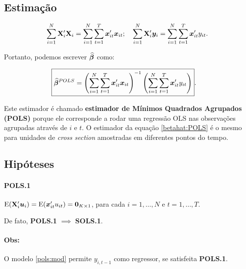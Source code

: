 \documentclass[11pt, oneside, a4paper, article]{article}
\numberwithin{equation}{section}
\begin{document}
\subsection{Estimação}

\begin{align*}
\sum_{i=1}^{N} \mathbf{X}_{i}' \mathbf{X}_{i}
=
\sum_{i=1}^{N} \sum_{t=1}^{T} \boldsymbol{x}_{it}' \boldsymbol{x}_{it};
\quad
\sum_{i=1}^{N} \mathbf{X}_{i}' \boldsymbol{y}_{i}
=
\sum_{i=1}^{N} \sum_{t=1}^{T} \boldsymbol{x}_{it}' y_{it}.
\end{align*}

Portanto, podemos escrever $\widehat{\boldsymbol{\beta}}$ como:

\vspace{-1 em}
\begin{align} \label{betahat:POLS}
\Aboxed{
\betahatbold^{POLS} =
\left( \sum_{i=1}^{N} \sum_{t=1}^{T} \xvec_{it}' \xvec_{it} \right)^{-1}
\left( \sum_{i=1}^{N} \sum_{t=1}^{T} \xvec_{it}' y_{it} \right)
}.
\end{align}

Este estimador é chamado \textbf{estimador de Mínimos Quadrados Agrupados (POLS)} porque ele corresponde a rodar uma regressão OLS nas observações agrupadas através de $i$ e $t$. 
O estimador da equação \eqref{betahat:POLS} é o mesmo para unidades de \textit{cross section} amostradas em diferentes pontos do tempo.

\subsection{Hipóteses}

\paragraph{POLS.1} $\text{E}(\mathbf{X}_{i}' \boldsymbol{u}_{i}) = \text{E}(\boldsymbol{x}_{it}'u_{it}) = \boldsymbol{0}_{K \times 1}$, para cada
$i=1, \dots, N$ e $t=1, \dots, T$.

\noindent
De fato, \textbf{POLS.1} $\implies$ \textbf{SOLS.1}.

\paragraph{Obs:}
O modelo \eqref{pols:mod} permite $y_{i,t-1}$ como regressor, se satisfeita \textbf{POLS.1}.
\end{document}
